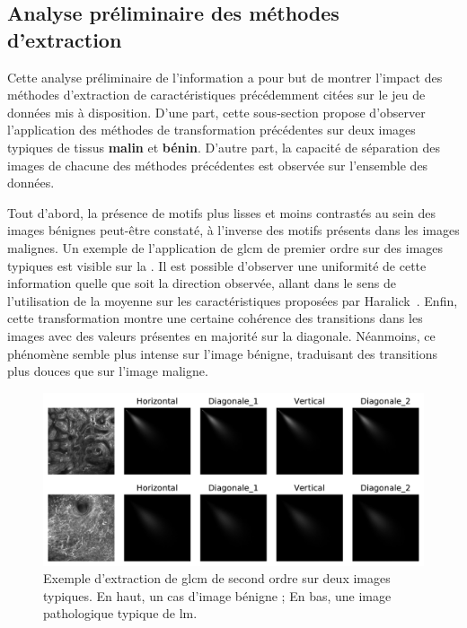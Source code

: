 \subsection{Analyse préliminaire des méthodes d'extraction}
Cette analyse préliminaire de l'information a pour but de montrer l'impact des méthodes d'extraction de caractéristiques précédemment citées sur le jeu de données mis à disposition. D'une part, cette sous-section propose d'observer l'application des méthodes de transformation précédentes sur deux images typiques de tissus \textbf{malin} et \textbf{bénin}. D'autre part, la capacité de séparation des images de chacune des méthodes précédentes est observée sur l'ensemble des données.\par

Tout d'abord, la présence de motifs plus lisses et moins contrastés au sein des images bénignes peut-être constaté, à l'inverse des motifs présents dans les images malignes. Un exemple de l'application de \gls{glcm} de premier ordre sur des images typiques est visible sur la . Il est possible d'observer une uniformité de cette information quelle que soit la direction observée, allant dans le sens de l'utilisation de la moyenne sur les caractéristiques proposées par Haralick~. Enfin, cette transformation montre une certaine cohérence des transitions dans les images avec des valeurs présentes en majorité sur la diagonale. Néanmoins, ce phénomène semble plus intense sur l'image bénigne, traduisant des transitions plus douces que sur l'image maligne.\par

\begin{figure}[H]
    \centering
    \includegraphics[width=\linewidth]{contents/chapter_5/resources/example_glcm.pdf}
    \caption{Exemple d'extraction de \gls{glcm} de second ordre sur deux images typiques. En haut, un cas d'image bénigne ; En bas, une image pathologique typique de \gls{lm}.}
    \label{fig:example_glcm}
\end{figure}\par

